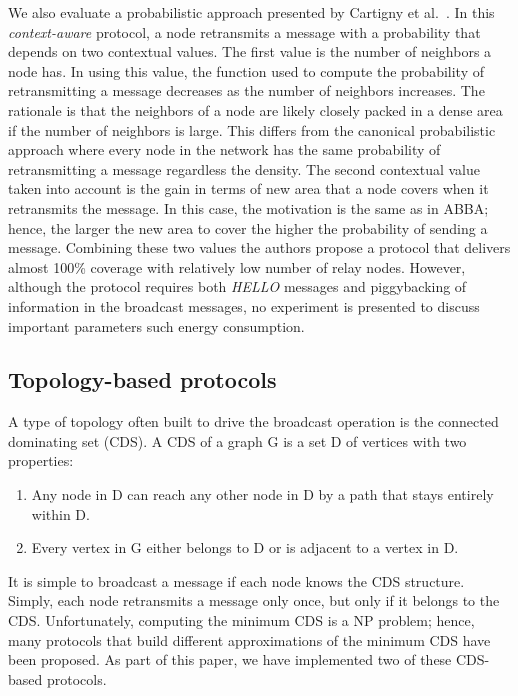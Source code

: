 We also evaluate a probabilistic approach presented by Cartigny et al.~\cite{Cartigny:2003:BNR:2727141.2727459}.
In this \textit{context-aware} protocol, a node retransmits a message with a probability that depends on two contextual values.
The first value is the number of neighbors a node has.
In using this value, the function used to compute the probability of retransmitting a message decreases as the number of neighbors increases.
The rationale is that the neighbors of a node are likely closely packed in a dense area if the number of neighbors is large.
This differs from the canonical probabilistic approach where every node in the network has the same probability of retransmitting a message regardless the density.
The second contextual value taken into account is the gain in terms of new area that a node covers when it retransmits the message.
In this case, the motivation is the same as in ABBA; hence, the larger the new area to cover the higher the probability of sending a message. 
Combining these two values the authors propose a protocol that delivers almost 100\% coverage with relatively low number of relay nodes.
However, although the protocol requires both \textit{HELLO} messages and piggybacking of information in the broadcast messages, no experiment is presented to discuss important parameters such energy consumption. 


\subsection*{Topology-based protocols}

A type of topology often built to drive the broadcast operation is the connected dominating set (CDS).
A CDS of a graph G is a set D of vertices with two properties:

\begin{enumerate}
	\item Any node in D can reach any other node in D by a path that stays entirely within D.
	\item Every vertex in G either belongs to D or is adjacent to a vertex in D.
\end{enumerate}

It is simple to broadcast a message if each node knows the CDS structure.
Simply, each node retransmits a message only once, but only if it belongs to the CDS.
Unfortunately, computing the minimum CDS is a NP problem; hence, many protocols that build different approximations of the minimum CDS have been proposed.
As part of this paper, we have implemented two of these CDS-based protocols.

